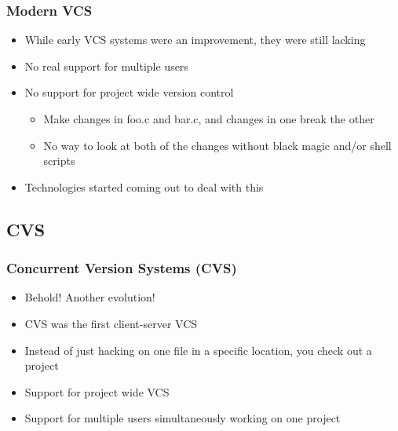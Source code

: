 \documentclass{beamer}
\begin{document}
\begin{frame}
    \frametitle{Modern VCS}
    \begin{itemize}
	\item While early VCS systems were an improvement, they were still lacking
	\item No real support for multiple users
	\item No support for project wide version control
	\begin{itemize}
	    \item Make changes in foo.c and bar.c, and changes in one break the other
	    \item No way to look at both of the changes without black magic and/or shell scripts
	\end{itemize}
	\item Technologies started coming out to deal with this 
    \end{itemize}
\end{frame}

\subsection{CVS}

\begin{frame}
    \frametitle{Concurrent Version Systems (CVS)}
    \begin{itemize}
	\item Behold! Another evolution!
	\item CVS was the first client-server VCS
	\item Instead of just hacking on one file in a specific location, you check out a project
	\item Support for project wide VCS
	\item Support for multiple users simultaneously working on one project
    \end{itemize}
\end{frame}
\end{document}
